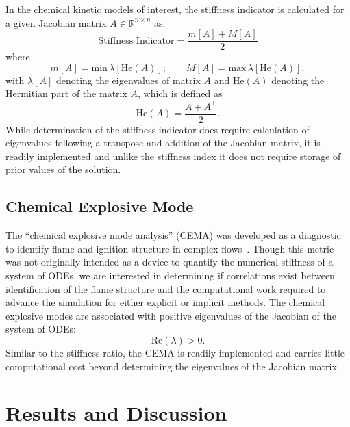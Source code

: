 \documentclass[12pt]{ussci}
\begin{document}
In the chemical kinetic models of interest, the stiffness indicator is calculated for a given Jacobian matrix $A \in \mathbb{R}^{n \times n}$ as:
\begin{equation}
	\textrm{Stiffness Indicator} = \frac{m[A] + M[A]}{2}
\end{equation}
where
\begin{equation}
	m[A] = \textrm{min}\,\lambda[\textrm{He}(A)];\qquad M[A] = \textrm{max}\,\lambda[\textrm{He}(A)],
\end{equation}
with $\lambda [A]$ denoting the eigenvalues of matrix $A$ and $\textrm{He}(A)$ denoting the Hermitian part of the matrix $A$, which is defined as
\begin{equation}
	\textrm{He}(A) = \frac{A + A^\intercal}{2}.
\end{equation}
While determination of the stiffness indicator does require calculation of eigenvalues following a transpose and addition of the Jacobian matrix, it is readily implemented and unlike the stiffness index it does not require storage of prior values of the solution.

\subsection{Chemical Explosive Mode}
The ``chemical explosive mode analysis'' (CEMA) was developed as a diagnostic to identify flame and ignition structure in complex flows~\cite{Yoo2009}.
Though this metric was not originally intended as a device to quantify the numerical stiffness of a system of ODEs, we are interested in determining if correlations exist between identification of the flame structure and the computational work required to advance the simulation for either explicit or implicit methods.
The chemical explosive modes are associated with positive eigenvalues of the Jacobian of the system of ODEs:
\begin{equation}
	\textrm{Re}(\lambda) > 0.
\end{equation}
Similar to the stiffness ratio, the CEMA is readily implemented and carries little computational cost beyond determining the eigenvalues of the Jacobian matrix.

\section{Results and Discussion}
\end{document}
